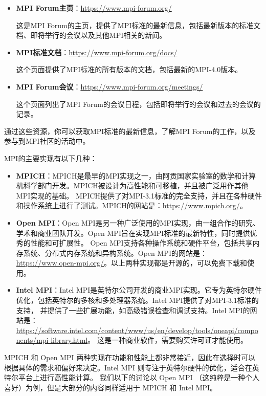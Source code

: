 \documentclass{ctexart}
\begin{document}
\begin{itemize}  
    \item \textbf{MPI Forum主页}：\url{https://www.mpi-forum.org/}  
    
  这是MPI Forum的主页，提供了MPI标准的最新信息，包括最新版本的标准文档、即将举行的会议以及其他MPI相关的新闻。  
  
    \item \textbf{MPI标准文档}：\url{https://www.mpi-forum.org/docs/}  
    
  这个页面提供了MPI标准的所有版本的文档，包括最新的MPI-4.0版本。  
  
    \item \textbf{MPI Forum会议}：\url{https://www.mpi-forum.org/meetings/}  
    
  这个页面列出了MPI Forum的会议日程，包括即将举行的会议和过去的会议的记录。  
\end{itemize}    
通过这些资源，你可以获取MPI标准的最新信息，了解MPI Forum的工作，以及参与到MPI社区的活动中。  

MPI的主要实现有以下几种：  
  
\begin{itemize}  
    \item \textbf{MPICH}：MPICH是最早的MPI实现之一，由阿贡国家实验室的数学和计算机科学部门开发。MPICH被设计为高性能和可移植，并且被广泛用作其他MPI实现的基础。
    MPICH提供了对MPI-3.1标准的完全支持，并且在各种硬件和操作系统上进行了测试。MPICH的网站是：\url{https://www.mpich.org/}。  
  
    \item \textbf{Open MPI}：Open MPI是另一种广泛使用的MPI实现，由一组合作的研究、学术和商业团队开发。Open MPI旨在实现MPI标准的最新特性，同时提供优秀的性能和可扩展性。
    Open MPI支持各种操作系统和硬件平台，包括共享内存系统、分布式内存系统和异构系统。Open MPI的网站是：\url{https://www.open-mpi.org/}。以上两种实现都是开源的，可以免费下载和使用。  
  
    \item \textbf{Intel MPI}：Intel MPI是英特尔公司开发的商业MPI实现。它专为英特尔硬件优化，包括英特尔的多核和多处理器系统。Intel MPI提供了对MPI-3.1标准的支持，
    并提供了一些扩展功能，如高级错误检查和调试支持。Intel MPI的网站是：\url{https://software.intel.com/content/www/us/en/develop/tools/oneapi/components/mpi-library.html}。  
    这是一种商业软件，需要购买许可证才能使用。
\end{itemize}  

MPICH 和 Open MPI 两种实现在功能和性能上都非常接近，因此在选择时可以根据具体的需求和偏好来决定。Intel MPI 则专注于英特尔硬件的优化，适合在英特尔平台上进行高性能计算。
我们以下的讨论以 Open MPI （这纯粹是一种个人喜好）为例，但是大部分的内容同样适用于 MPICH 和 Intel MPI。
\end{document}
